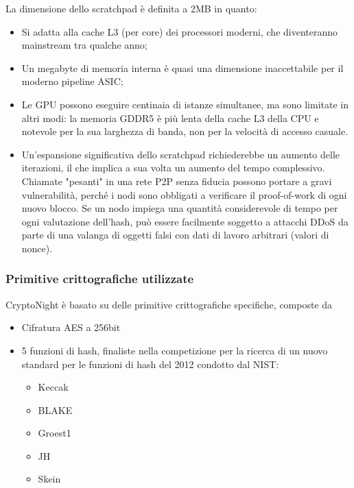 La dimensione dello scratchpad è definita a 2MB in quanto:

\begin{itemize}[noitemsep]
\item
  Si adatta alla cache L3 (per core) dei processori moderni, che
  diventeranno mainstream tra qualche anno;
\item
  Un megabyte di memoria interna è quasi una dimensione inaccettabile
  per il moderno pipeline ASIC;
\item
  Le GPU possono eseguire centinaia di istanze simultanee, ma sono
  limitate in altri modi: la memoria GDDR5 è più lenta della cache L3
  della CPU e notevole per la sua larghezza di banda, non per la
  velocità di accesso casuale.
\item
  Un'espansione significativa dello scratchpad
  richiederebbe un aumento delle iterazioni, il che implica a sua volta
  un aumento del tempo complessivo. Chiamate "pesanti" in una rete P2P
  senza fiducia possono portare a gravi vulnerabilità, perché i nodi
  sono obbligati a verificare il proof-of-work di ogni nuovo blocco. Se
  un nodo impiega una quantità considerevole di tempo per ogni
  valutazione dell'hash, può essere facilmente soggetto
  a attacchi DDoS da parte di una valanga di oggetti falsi con dati di
  lavoro arbitrari (valori di nonce).
\end{itemize}






\subsubsection{Primitive crittografiche utilizzate}\label{primitive-crittografiche-utilizzate}
CryptoNight è basato su delle primitive crittografiche specifiche, composte da 
\begin{itemize}
  \item
  Cifratura AES a 256bit
  \item 5 funzioni di hash, finaliste
  nella competizione per la ricerca di un nuovo standard per le funzioni
  di hash del 2012 condotto dal NIST:
  \begin{itemize}
    \item Keccak
    \item BLAKE
    \item Groest1
    \item JH
    \item Skein
  \end{itemize}
\end{itemize}

